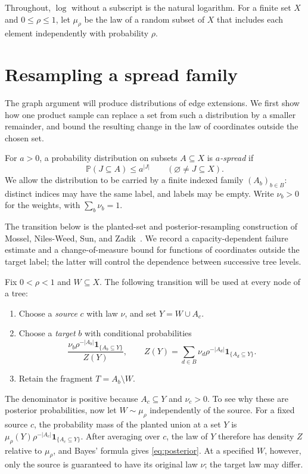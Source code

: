 \documentclass[11pt]{article}
\numberwithin{equation}{section}
\newcommand{\PP}{\mathbb P}
\newcommand{\ind}{\mathbf 1}
\begin{document}
Throughout, $\log$ without a subscript is the natural logarithm.
For a finite set $X$ and $0\le\rho\le1$, let $\mu_\rho$ be the law
of a random subset of $X$ that includes each element independently
with probability $\rho$.

\section{Resampling a spread family}\label{sec:resampling}

The graph argument will produce distributions of edge extensions. We first
show how one product sample can replace a set from such a distribution
by a smaller remainder, and bound the resulting change in the law of
coordinates outside the chosen set.

For $a>0$, a probability distribution on subsets $A\subseteq X$ is
\emph{$a$-spread} if
\begin{equation}\label{eq:spread}
 \PP(J\subseteq A)\le a^{|J|}
 \qquad(\varnothing\ne J\subseteq X).
\end{equation}
We allow the distribution to be carried by a finite indexed family
$(A_b)_{b\in B}$: distinct indices may have the same label, and labels
may be empty. Write $\nu_b>0$ for the weights, with $\sum_b\nu_b=1$.

The transition below is the planted-set and posterior-resampling
construction of Mossel, Niles-Weed, Sun, and Zadik~\cite[Sections~2.1--2.3]{MNSZ25}.
We record a capacity-dependent failure estimate and a change-of-measure
bound for functions of coordinates outside the target label; the latter
will control the dependence between successive tree levels.

Fix $0<\rho<1$ and $W\subseteq X$. The following transition will be
used at every node of a tree:
\begin{enumerate}[label=\arabic*.,leftmargin=2em,itemsep=2pt]
 \item Choose a \emph{source} $c$ with law $\nu$, and set $Y=W\cup A_c$.
 \item Choose a \emph{target} $b$ with conditional probabilities
 \begin{equation}\label{eq:posterior}
  \frac{\nu_b\rho^{-|A_b|}\ind_{\{A_b\subseteq Y\}}}{Z(Y)},
  \qquad
  Z(Y)=\sum_{d\in B}\nu_d\rho^{-|A_d|}
                  \ind_{\{A_d\subseteq Y\}}.
 \end{equation}
 \item Retain the fragment $T=A_b\setminus W$.
\end{enumerate}
The denominator is positive because $A_c\subseteq Y$ and $\nu_c>0$.
To see why these are posterior probabilities, now let $W\sim\mu_\rho$
independently of the source. For a fixed source $c$, the probability
mass of the planted union at a set $Y$ is
$\mu_\rho(Y)\rho^{-|A_c|}\ind_{\{A_c\subseteq Y\}}$.
After averaging over $c$, the law of $Y$ therefore has density $Z$
relative to $\mu_\rho$, and Bayes' formula gives
\eqref{eq:posterior}. At a specified $W$, however, only the source
is guaranteed to have its original law $\nu$; the target law may differ.
\end{document}
